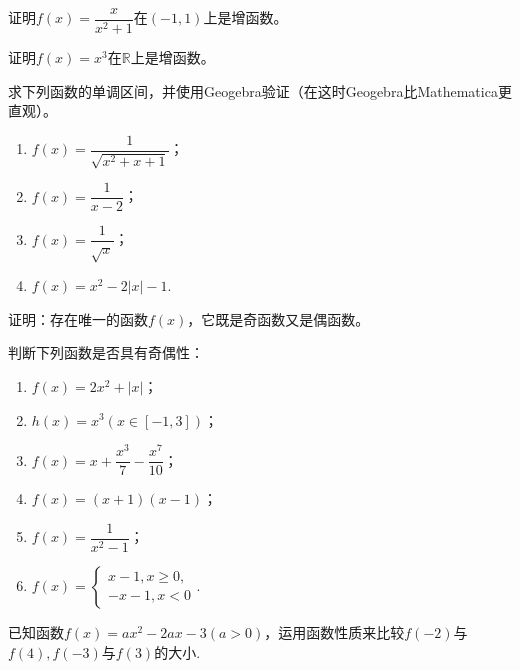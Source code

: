 \documentclass[lang=cn,math=cm,chinesefont=nofont,11pt,scheme=chinese,twocol]{elegantbook}
\begin{document}
\begin{spacing}{1.8}
  \begin{exercise}
    证明$f(x)=\dfrac x{x^2+1}$在$(-1,1)$上是增函数。
  \end{exercise}
  
  \begin{exercise}
    证明$f(x)=x^3$在$\mathbb{R}$上是增函数。
  \end{exercise}
  
  \begin{exercise}
    求下列函数的单调区间，并使用Geogebra验证（在这时Geogebra比Mathematica更直观）。
  \end{exercise}
  
  \begin{enumerate}
    \item $f(x)=\dfrac{1}{\sqrt{x^{2}+x+1}}$；
    \item $f(x)=\dfrac{1}{x-2}$；
    \item $f(x)=\dfrac1{\sqrt{x}}$；
    \item $f(x)=x^{2}-2|x|-1$.
  \end{enumerate}
  
  \begin{exercise}
    证明：存在唯一的函数$f(x)$，它既是奇函数又是偶函数。
  \end{exercise}
  
  \begin{exercise}
    判断下列函数是否具有奇偶性：
  \end{exercise}
  
  \begin{enumerate}
    \item $f(x)=2x^2+|x|$；
    \item $h(x)=x^3(x\in[-1,3])$；
    \item $f(x)=x+\dfrac{x^3}7-\dfrac{x^7}{10}$；
    \item $f(x)=(x+1)(x-1)$；
    \item $f(x)=\dfrac{1}{x^{2}-1}$；
    \item $f(x)=\begin{cases}x-1, x\geqslant0,\\-x-1, x<0\end{cases}$.
  \end{enumerate}
\end{spacing}

\begin{exercise}\label{2017RJB_bx1_P111.B7}
  已知函数$f(x)=ax^2-2ax-3(a>0)$，运用函数性质来比较$f(-2)$与$f(4),f(-3)$与$f(3)$的大小.
\end{exercise}
\end{document}
